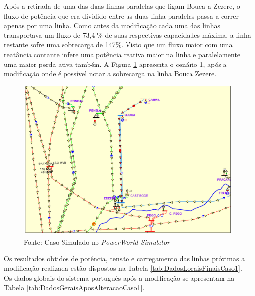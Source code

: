 Após a retirada de uma das duas linhas paralelas que ligam Bouca a Zezere, o fluxo de potência que era dividido entre as duas linha paralelas passa a correr apenas por uma linha. Como antes da modificação cada uma das linhas transportava um fluxo de 73,4 \% de suas respectivas capacidades máxima, a linha restante sofre uma sobrecarga de 147\%.  Visto que um fluxo maior com uma reatância contante infere uma potência reativa maior na linha e paralelamente uma maior perda ativa também. A Figura \ref{fig:caso1After} apresenta o cenário 1, após a modificação onde é possível notar a sobrecarga na linha Bouca Zezere. 

\begin{figure}[H]
	\centering
	\captionsetup{width=1\textwidth, font=footnotesize, textfont=bf}	
	\includegraphics[width=1\linewidth]{img/caso1After.pdf}
	\caption{Cenário 1, após à modificação}
	\vspace{-3.5mm}
	\caption*{Fonte: Caso Simulado no \textit{PowerWorld\textsuperscript{\textregistered} Simulator}}
	\label{fig:caso1After}
\end{figure}

Os resultados obtidos de potência, tensão e carregamento das linhas próximas a modificação realizada estão dispostos na Tabela \ref{tab:DadosLocaisFinaisCaso1}. Os dados globais do sistema português após a modificação se apresentam na Tabela \ref{tab:DadosGeraisAposAlteracaoCaso1}.

